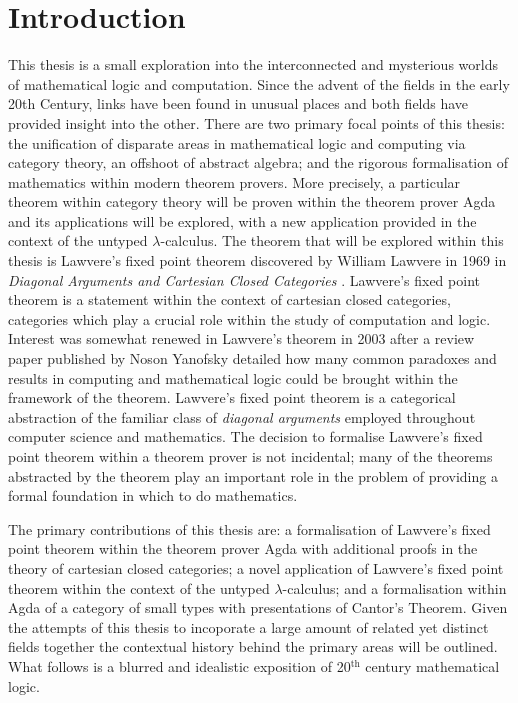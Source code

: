 
\section{Introduction}

This thesis is a small exploration into the interconnected and mysterious worlds
of mathematical logic and computation. Since the advent of the fields in the
early 20th Century, links have been found in unusual places and both fields have
provided insight into the other. There are two primary focal points of this
thesis: the unification of disparate areas in mathematical logic and computing
via category theory, an offshoot of abstract algebra; and the rigorous
formalisation of mathematics within modern theorem provers. More precisely, a
particular theorem within category theory will be proven within the theorem
prover Agda and its applications will be explored, with a new application
provided in the context of the untyped $\lambda$-calculus. The theorem that will
be explored within this thesis is Lawvere's fixed point theorem discovered by
William Lawvere in 1969 in \textit{Diagonal Arguments and Cartesian Closed
Categories} \cite{lawvere1969diagonal}. Lawvere's fixed point theorem is a
statement within the context of cartesian closed categories, categories which
play a crucial role within the study of computation and logic. Interest was
somewhat renewed in Lawvere's theorem in 2003 after a review paper published by
Noson Yanofsky \cite{yanofsky2003universal} detailed how many common paradoxes
and results in computing and mathematical logic could be brought within the
framework of the theorem. Lawvere's fixed point theorem is a categorical
abstraction of the familiar class of \textit{diagonal arguments} employed
throughout computer science and mathematics. The decision to formalise Lawvere's
fixed point theorem within a theorem prover is not incidental; many of the
theorems abstracted by the theorem play an important role in the problem of
providing a formal foundation in which to do mathematics.

The primary contributions of this thesis are: a formalisation of Lawvere's fixed
point theorem within the theorem prover Agda with additional proofs in the
theory of cartesian closed categories; a novel application of Lawvere's fixed
point theorem within the context of the untyped $\lambda$-calculus; and a
formalisation within Agda of a category of small types with presentations of
Cantor's Theorem. Given the attempts of this thesis to incoporate a large amount
of related yet distinct fields together the contextual history behind the
primary areas will be outlined. What follows is a blurred and idealistic
exposition of 20$^{\textrm{th}}$ century mathematical logic.

